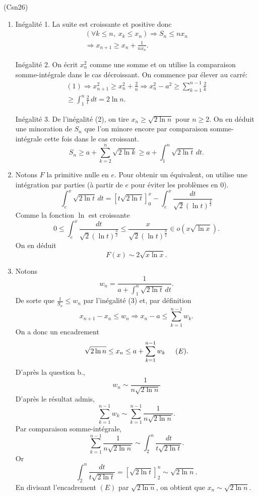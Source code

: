 \begin{tiny}(Csn26)\end{tiny} 
\begin{enumerate}
 \item Inégalité 1.\newline
La suite est croissante et positive donc
\begin{multline*}
\left( \forall k \leq n, \; x_k \leq x_n\right) 
 \Rightarrow S_n \leq nx_n \\
 \Rightarrow x_{n+1} \geq x_n + \frac{1}{nx_n}. 
\end{multline*}

Inégalité 2.\newline
On écrit $x_n^2$ comme une somme et on utilise la comparaison somme-intégrale dans le cas décroissant. On commence par élever au carré:
\begin{multline*}
 (1)\Rightarrow x_{n+1}^2 \geq x_n^2 + \frac{2}{n}
 \Rightarrow 
 x_n^2 - a^2 \geq \sum_{k=1}^{n-1}\frac{2}{k}\\
 \geq \int_1^n\frac{2}{t}\, dt = 2\ln n. 
\end{multline*}

Inégalité 3.\newline
De l'inégalité (2), on tire $x_n \geq \sqrt{2 \ln n}$ pour $n\geq 2$. On en déduit une minoration de $S_n$ que l'on minore encore par comparaison somme-intégrale cette fois dans le cas croissant.
\[
 S_n \geq a + \sum_{k=2}^{n}\sqrt{2\ln k} 
 \geq  a + \int_1^n \sqrt{2 \ln t}\, dt.
\]

 \item Notons $F$ la primitive nulle en $e$. Pour obtenir un équivalent, on utilise une intégration par parties (à partir de $e$ pour éviter les problèmes en $0$).
\[
 \int_e^x \sqrt{2\ln t}\,dt =
\left[ t \sqrt{2\ln t} \right]_0^x - \int_e^x \frac{dt}{\sqrt{2}(\ln t)^{\frac{3}{2}}} 
\]
Comme la fonction $\ln$ est croissante
\[
 0 \leq \int_e^x \frac{dt}{\sqrt{2}(\ln t)^{\frac{3}{2}}} \leq \frac{x}{\sqrt{2}(\ln t)^{\frac{3}{2}}}
 \in o(x \sqrt{\ln x}).
\]
On en déduit 
\[
 F(x) \sim 2\sqrt{x\ln x}.
\]
\item Notons
\[
 w_n = \frac{1}{a + \int_1^n \sqrt{2 \ln t}\, dt}.
\]
De sorte que $\frac{1}{S_n}\leq w_n$ par l'inégalité (3) et, par définition
\[
 x_{n+1} - x_n \leq w_n 
 \Rightarrow
 x_n - a \leq \sum_{k=1}^{n-1}w_k.
\]
On a donc un encadrement
\[
 \sqrt{2 \ln n} \leq x_n \leq a + \sum_{k=1}^{n-1}w_k \hspace{0.5cm} (E).
\]
D'après la question b.,
\[
 w_n \sim \frac{1}{n\sqrt{2 \ln n}}
\]
D'après le résultat admis,
\[
 \sum_{k=1}^{n-1}w_k \sim \sum_{k=1}^{n-1}\frac{1}{n\sqrt{2 \ln n}}.
\]
Par comparaison somme-intégrale,
\[
 \sum_{k=1}^{n-1}\frac{1}{n\sqrt{2 \ln n}} \sim \int_2^n \frac{dt}{t\sqrt{2 \ln t}}.
\]
Or
\[
 \int_2^n \frac{dt}{t\sqrt{2 \ln t}}=
 \left[ \sqrt{2 \ln t}\right]_2^n \sim \sqrt{2 \ln n} .
\]
En divisant l'encadrement $(E)$ par $\sqrt{2 \ln n}$, on obtient que $x_n \sim \sqrt{2 \ln n}$.
\end{enumerate}
